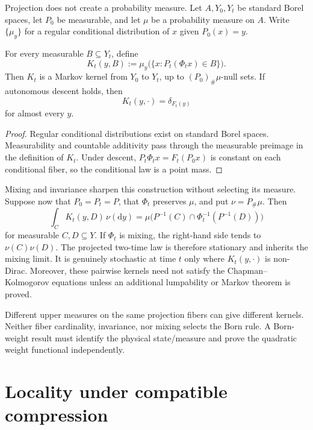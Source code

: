 \documentclass[11pt]{article}
\begin{document}
Projection does not create a probability measure.  Let $A,Y_0,Y_t$ be
standard Borel spaces, let $P_0$ be measurable, and let $\mu$ be a probability
measure on $A$.  Write $\{\mu_y\}$ for a regular conditional distribution of
$x$ given $P_0(x)=y$.

\begin{theorem}\label{thm:kernel}
For every measurable $B\subseteq Y_t$, define
\[
  K_t(y,B)
  :=\mu_y\bigl(\{x:P_t(\Phi_tx)\in B\}\bigr).
\]
Then $K_t$ is a Markov kernel from $Y_0$ to $Y_t$, up to
$(P_0)_\#\mu$-null sets.  If autonomous descent holds, then
\[
  K_t(y,\cdot)=\delta_{F_t(y)}
\]
for almost every $y$.
\end{theorem}

\begin{proof}
Regular conditional distributions exist on standard Borel spaces.
Measurability and countable additivity pass through the measurable preimage in
the definition of $K_t$.  Under descent, $P_t\Phi_tx=F_t(P_0x)$ is constant
on each conditional fiber, so the conditional law is a point mass.
\end{proof}

Mixing and invariance sharpen this construction without selecting its measure.
Suppose now that $P_0=P_t=P$, that $\Phi_t$ preserves $\mu$, and put
$\nu=P_\#\mu$.  Then
\begin{equation}
 \int_C K_t(y,D)\,\nu(\mathrm dy)
 =\mu\bigl(P^{-1}(C)\cap\Phi_t^{-1}(P^{-1}(D))\bigr)
 \label{eq:mixing}
\end{equation}
for measurable $C,D\subseteq Y$.  If $\Phi_t$ is mixing, the right-hand side
tends to $\nu(C)\nu(D)$.  The projected two-time law is therefore stationary
and inherits the mixing limit.  It is genuinely stochastic at time $t$ only
where $K_t(y,\cdot)$ is non-Dirac.  Moreover, these pairwise kernels need not
satisfy the Chapman--Kolmogorov equations unless an additional lumpability or
Markov theorem is proved.

Different upper measures on the same projection fibers can give different
kernels.  Neither fiber cardinality, invariance, nor mixing selects the Born
rule.  A Born-weight result must identify the physical state/measure and prove
the quadratic weight functional independently.

\section{Locality under compatible compression}
\end{document}
